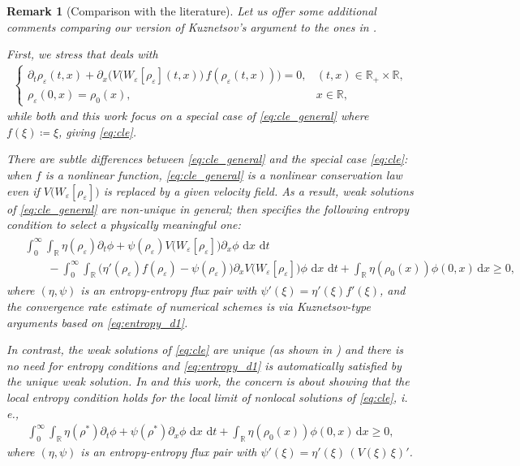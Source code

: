 \documentclass[10pt]{amsart}
\theoremstyle{plain}
\newtheorem{remark}[lemma]{Remark}
\theoremstyle{definition}
\numberwithin{equation}{section}
\newcommand{\R}{\mathbb{R}}
\newcommand{\eps}{{\varepsilon}}
\newcommand{\dt}{{\, \mathrm{d}t}}
\newcommand{\dx}{{\, \mathrm{d}x}}
\begin{document}
\begin{remark}[Comparison with the literature]
\label{rem:entr_lit}
Let us offer some additional comments comparing our version of Kuznetsov's argument to the ones in  \cite{MR4700412,MR4553943}.

First, we stress that \cite{MR4700412} deals with 
\begin{align}\label{eq:cle_general}
\begin{cases}
\partial_t \rho_\eps(t,x)  + \partial_x\Big(V\big(W_{\eps}[\rho_\eps](t,x))\,f(\rho_\eps(t,x))\Big)   	= 0,	& (t,x)\in  \R_+ \times \R, \\
\rho_\eps(0,x) = \rho_0(x),	&  x\in\R,
\end{cases}
\end{align}
while both \cite{MR4553943} and this work focus on a special case of \cref{eq:cle_general} where $f(\xi) \coloneqq \xi$, giving \cref{eq:cle}.

There are subtle differences between \cref{eq:cle_general} and the special case \cref{eq:cle}: when $f$ is a nonlinear function, \cref{eq:cle_general} is a nonlinear conservation law even if $V\big(W_{\eps}[\rho_\eps])$ is replaced by a given velocity field. As a result, weak solutions of \cref{eq:cle_general} are non-unique in general; then \cite{MR4700412} specifies the following entropy condition to select a physically meaningful one:
\begin{align}\label{eq:entropy_d1}
\begin{aligned}
&\int_0^\infty\int_{\R} \eta(\rho_\eps)\partial_t\phi + \psi(\rho_\eps) V\big(W_\eps[\rho_\eps]\big) \partial_x\phi \,\dx\,\dt \\
& \qquad -\int_0^\infty\int_{\R}  \big( \eta'(\rho_\eps)f(\rho_\eps) - \psi(\rho_\eps) \big) \partial_x V\big(W_\eps[\rho_\eps]\big) \phi \,\dx\,\dt + \int_\R \eta(\rho_0(x))\phi(0,x)\,\mathrm dx \geq0, \end{aligned}
\end{align}
where $(\eta,\psi)$ is an entropy-entropy flux pair with $\psi'(\xi)=\eta'(\xi)f'(\xi)$, and the convergence rate estimate of numerical schemes is via Kuznetsov-type arguments based on \cref{eq:entropy_d1}.

In contrast, the weak solutions of \cref{eq:cle} are unique (as shown in \cite{zbMATH06756308}) and there is no need for entropy conditions and \cref{eq:entropy_d1} is automatically satisfied by the unique weak solution. In \cite{MR4553943} and this work, the concern is about showing that the local entropy condition holds for the local limit of nonlocal solutions of \cref{eq:cle}, i.\,e., 
\begin{align}\label{eq:entropy_d2}
    \int_0^\infty\int_{\R}  \eta(\rho^\ast)\partial_t\phi + \psi(\rho^\ast)\partial_x\phi \,\dx\,\dt + \int_{\R} \eta(\rho_0(x))\phi(0,x)\,\mathrm dx \geq0,
\end{align}
where $(\eta,\psi)$ is an entropy-entropy flux pair with $\psi'(\xi) = \eta'(\xi)\,(V(\xi)\,\xi)'$.


\end{remark}
\end{document}
